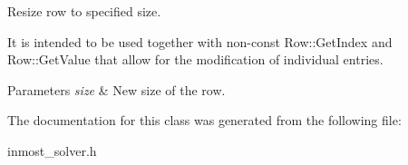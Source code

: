 Resize row to specified size. 

It is intended to be used together with non-\/const Row\-::\-Get\-Index and Row\-::\-Get\-Value that allow for the modification of individual entries. 
\begin{DoxyParams}{Parameters}
{\em size} & New size of the row. \\
\hline
\end{DoxyParams}


The documentation for this class was generated from the following file\-:\begin{DoxyCompactItemize}
\item 
inmost\-\_\-solver.\-h\end{DoxyCompactItemize}

